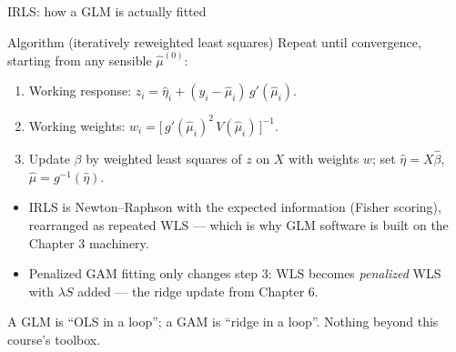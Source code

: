\documentclass[aspectratio=169,11pt]{beamer}
\begin{document}
\begin{frame}{IRLS: how a GLM is actually fitted}
  \footnotesize
  \begin{block}{Algorithm (iteratively reweighted least squares)}
    Repeat until convergence, starting from any sensible $\hat\mu^{(0)}$:
    \begin{enumerate}
      \item Working response: \;
            $z_i = \hat\eta_i + (y_i - \hat\mu_i)\, g'(\hat\mu_i)$.
      \item Working weights: \;
            $w_i = \big[\, g'(\hat\mu_i)^2\, V(\hat\mu_i)\, \big]^{-1}$.
      \item Update $\beta$ by weighted least squares of $z$ on $X$ with weights $w$;
            set $\hat\eta = X\hat\beta$, $\hat\mu = g^{-1}(\hat\eta)$.
    \end{enumerate}
  \end{block}
  \begin{readme}
    \begin{itemize}
      \item IRLS is Newton--Raphson with the expected information (Fisher scoring),
            rearranged as repeated WLS --- which is why GLM software is built on the
            Chapter 3 machinery.
      \item Penalized GAM fitting only changes step 3: WLS becomes \emph{penalized}
            WLS with $\lambda S$ added --- the ridge update from Chapter 6.
    \end{itemize}
  \end{readme}
  \begin{takeaway}
    A GLM is ``OLS in a loop''; a GAM is ``ridge in a loop''. Nothing beyond this
    course's toolbox.
  \end{takeaway}
\end{frame}
\end{document}
